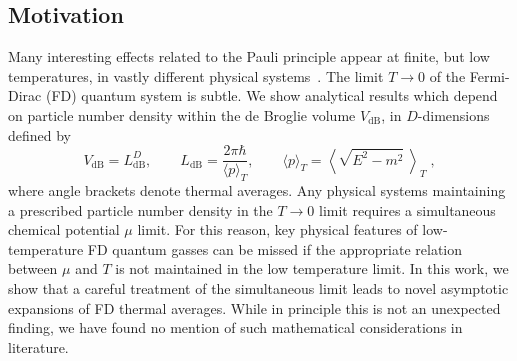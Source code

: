 \documentclass[sn-mathphys,Numbered]{sn-jnl}
\begin{document}
\subsection{Motivation}\label{Motivation}
Many interesting effects related to the Pauli principle appear at finite, but low temperatures, in vastly different physical systems~\cite{bludman1977equation,Elze:1980er,Ferrer:2019xlr,Kuebler:2021Th}. The limit $T\to 0$ of the Fermi-Dirac (FD) quantum system is subtle. We show analytical results which depend on particle number density within the de Broglie volume $V_\mathrm{dB}$, in $D$-dimensions defined by
\begin{equation}\label{dBVol}
V_\mathrm{dB}=L_\mathrm{dB}^D, \qquad L_\mathrm{dB}=
\frac{2\pi\hbar}{\langle p\rangle_T},\qquad \langle p\rangle_T=
\left\langle \sqrt{E^2-m^2}\ \right\rangle_T \;,
\end{equation}
 where angle brackets denote thermal averages. Any physical systems maintaining a prescribed particle number density in the $T\to 0$ limit requires a simultaneous chemical potential $\mu$ limit. For this reason, key physical features of low-temperature FD quantum gasses can be missed if the appropriate relation between $\mu$ and $T$ is not maintained in the low temperature limit. In this work, we show that a careful treatment of the simultaneous limit leads to novel asymptotic expansions of FD thermal averages. While in principle this is not an unexpected finding, we have found no mention of such mathematical considerations in literature.
\end{document}
